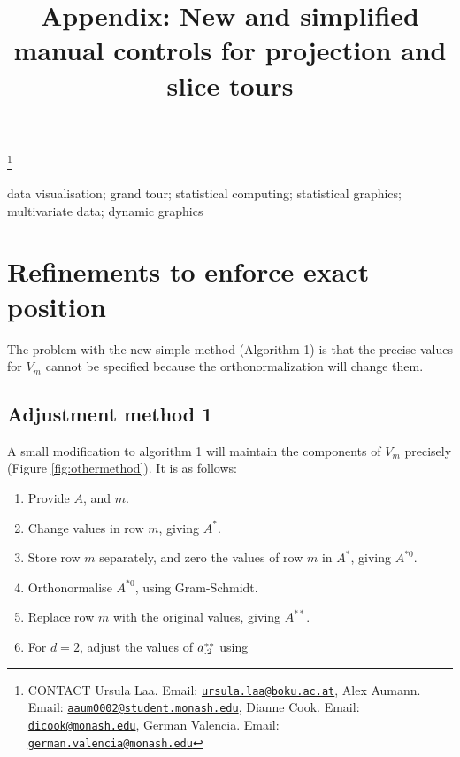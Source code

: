 \documentclass[]{interact}
\theoremstyle{plain}%
\theoremstyle{definition}
\theoremstyle{remark}
\providecommand{\tightlist}{%
  \setlength{\itemsep}{0pt}\setlength{\parskip}{0pt}}
\def\tightlist{}
\begin{document}

\title{Appendix: New and simplified manual controls for projection and
slice tours}


\author{
}

\thanks{CONTACT Ursula
Laa. Email: \href{mailto:ursula.laa@boku.ac.at}{\nolinkurl{ursula.laa@boku.ac.at}}, Alex
Aumann. Email: \href{mailto:aaum0002@student.monash.edu}{\nolinkurl{aaum0002@student.monash.edu}}, Dianne
Cook. Email: \href{mailto:dicook@monash.edu}{\nolinkurl{dicook@monash.edu}}, German
Valencia. Email: \href{mailto:german.valencia@monash.edu}{\nolinkurl{german.valencia@monash.edu}}}

\maketitle


\begin{keywords}
data visualisation; grand tour; statistical computing; statistical
graphics; multivariate data; dynamic graphics
\end{keywords}

\hypertarget{refinements-to-enforce-exact-position}{%
\section{Refinements to enforce exact
position}\label{refinements-to-enforce-exact-position}}

The problem with the new simple method (Algorithm 1) is that the precise
values for \(V_m\) cannot be specified because the orthonormalization
will change them.

\hypertarget{adjustment-method-1}{%
\subsection{Adjustment method 1}\label{adjustment-method-1}}

A small modification to algorithm 1 will maintain the components of
\(V_m\) precisely (Figure \ref{fig:othermethod}). It is as follows:

\begin{enumerate}
\def\labelenumi{\arabic{enumi}.}
\tightlist
\item
  Provide \(A\), and \(m\).
\item
  Change values in row \(m\), giving \(A^*\).
\item
  Store row \(m\) separately, and zero the values of row \(m\) in
  \(A^*\), giving \(A^{*0}\).
\item
  Orthonormalise \(A^{*0}\), using Gram-Schmidt.
\item
  Replace row \(m\) with the original values, giving \(A^{**}\).
\item
  For \(d=2\), adjust the values of \({\boldmath a}^{**}_{.2}\) using
\end{enumerate}
\end{document}
